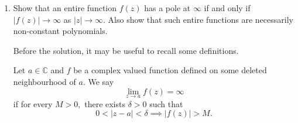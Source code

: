 \documentclass[12pt]{article}
\theoremstyle{definition}
\newenvironment{soln}{\begin{proof}[Solution]}{\end{proof}}
\begin{document}
\begin{enumerate}[leftmargin=*]
\begin{soln}
\begin{equation*}
    		P(z) = (z - a_1)\cdots(z - a_n).
    	\end{equation*}
    	Fix $k \in \{1, \ldots, n\}.$ Note that $P(a_k) = 0.$ Thus, the above can be written as:
    	\begin{equation*} 
    		P(z) - P(a_k) = (z - a_1)\cdots(z - a_n).
    	\end{equation*}
    	If $z \neq a_k,$ then we may divide by $z - a_k$ to get
    	\begin{equation*} 
    		\dfrac{P(z) - P(a_k)}{z - a_k} = \prod_{j \neq k}^{}(z - a_j).
    	\end{equation*}
    	Letting $z \to a_k$ gives the answer.
    \end{soln}
    \begin{soln}
    	{\color{myupdatecolor}Here's an alternate solution.}

    	As above, we can write
    	\begin{equation*} 
    		P(z) = \prod_{j = 1}^{n}(z - a_j).
    	\end{equation*}
    	Fix some $k \in \{1, \ldots, n\}.$ Then, the above can be written as
    	\begin{equation*} 
    		P(z) = (z - a_k)P_k(z),	
    	\end{equation*}
    	where $P_k$ is defined as
    	\begin{equation*} 
    		P_k(z) \vcentcolon= \prod_{j \neq k}(z - a_j).
    	\end{equation*}
    	Note that $P_k(a_k)$ is precisely the LHS of the equation given in the question. On the other hand, using product rule, we have
    	\begin{equation*} 
    		P'(z) = (z - a_k)P_k'(z) + P_k(z).
    	\end{equation*}
    	Substituting $z = a_k$ above gives the answer.
    \end{soln}
    \item Show that an entire function $f(z)$ has a pole at $\infty$ if and only if $|f(z)| \to \infty$ as $|z| \to \infty.$ Also show that such entire functions are necessarily non-constant polynomials.

    {\color{myupdatecolor}Before the solution, it may be useful to recall some definitions.}

    \begin{defn}
    	Let $a \in \mathbb{C}$ and $f$ be a complex valued function defined on some deleted neighbourhood of $a.$ We say 
    	\begin{equation*} 
    		\lim_{z\to a}f(z) = \infty
    	\end{equation*}
    	if for every $M > 0,$ there exists $\delta > 0$ such that
    	\begin{equation*} 
    		0 < |z - a| < \delta \implies |f(z)| > M.
    	\end{equation*}
    \end{defn}


\end{enumerate}
\end{document}

